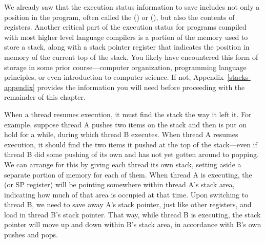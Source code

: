We already saw that the execution status information to save includes
not only a position in the program, often called the 
() or  (), but also the contents of registers.
Another critical part of the execution status for programs compiled
with most higher level language compilers is a portion of the memory
used to store a stack, along with a stack pointer register that
indicates the position in memory of the current top of the stack.  You
likely have encountered this form of storage in some prior
course---computer organization, programming language principles, or
even introduction to computer science.  If not,
Appendix~\ref{stacks-appendix} provides the information you will need
before proceeding with the remainder of this chapter.

When a thread resumes execution, it must find the stack
the way it left it.  For example, suppose thread A pushes two items on the
stack and then is put on hold for a while, during which thread B executes.
When thread A resumes execution, it should find the two items it pushed at
the top of the stack---even if thread B did some pushing of its own
and has not yet gotten around to popping.  We can arrange for this by
giving each thread its own stack, setting aside a separate portion of
memory for each of them.  When thread A is executing, the  (or SP register) will be pointing somewhere within thread A's
stack area, indicating how much of that area is occupied at that time.
Upon switching to thread B, we need to save away A's stack pointer,
just like other registers, and load in thread B's stack pointer.  That
way, while thread B is executing, the stack pointer will move up and
down within B's stack area, in accordance with B's own pushes and
pops.

